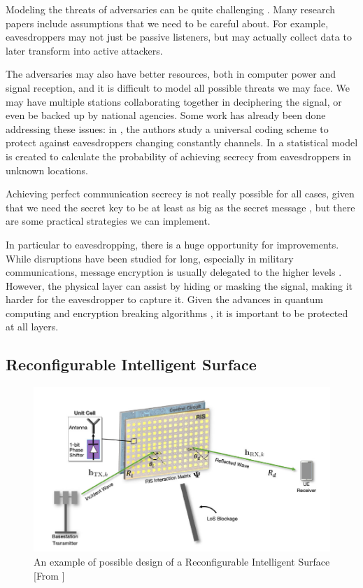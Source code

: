 
Modeling the threats of adversaries can be quite challenging \cite{7120011}. Many research papers include assumptions that we need to be careful about. For example, eavesdroppers may not just be passive listeners, but may actually collect data to later transform into active attackers.

The adversaries may also have better resources, both in computer power and signal reception, and it is difficult to model all possible threats we may face. We may have multiple stations collaborating together in deciphering the signal, or even be backed up by national agencies. Some work has already been done addressing these issues: in \cite{5707054}, the authors study a universal coding scheme to protect against eavesdroppers changing constantly channels. In \cite{7543509} a statistical model is created to calculate the probability of achieving secrecy from eavesdroppers in unknown locations.


Achieving perfect communication secrecy is not really possible for all cases, given that we need the secret key to be at least as big as the secret message \cite{6769090}, but there are some practical strategies we can implement.

In particular to eavesdropping, there is a huge opportunity for improvements. While disruptions have been studied for long, especially in military communications, message encryption is usually delegated to the higher levels \cite{6739367}. However, the physical layer can assist by hiding or masking the signal, making it harder for the eavesdropper to capture it. Given the advances in quantum computing and encryption breaking algorithms \cite{365700}, it is important to be protected at all layers.

\subsection{Reconfigurable Intelligent Surface}

\begin{figure}[H]
  \centering
  \includegraphics[width=0.5\linewidth]{imgs/RIS model.png}
  \caption{An example of possible design of a Reconfigurable Intelligent Surface [From \cite{9732917}]}
\end{figure}

